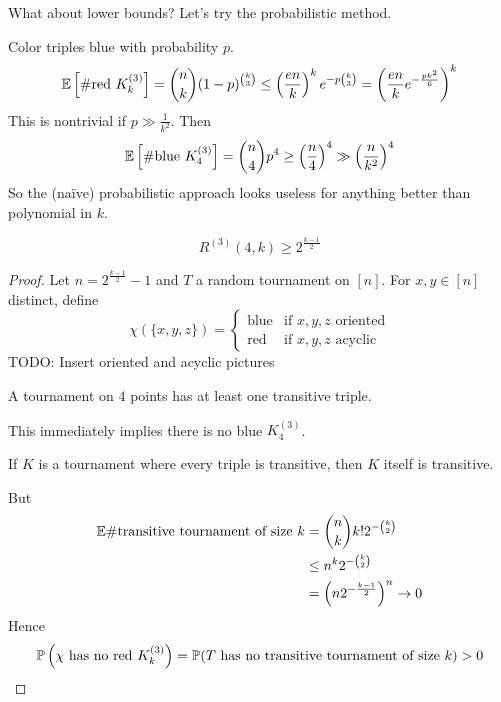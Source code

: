 \documentclass{article}
\begin{document}
\newlec

What about lower bounds? Let's try the probabilistic method.

Color triples blue with probability $p$.
$$\bbE\left[\#\text{red }K_k^{(3)}\right] = \binom nk (1 - p)^{\binom k3} \le \left(\frac{en}k\right)^k e^{-p\binom k3} = \left(\frac{en}k e^{-\frac{pk^2}6}\right)^k$$
This is nontrivial if $p \gg \frac 1{k^2}$. Then
$$\bbE\left[\#\text{blue }K_4^{(3)}\right] = \binom n4 p^4 \ge \left(\frac n4\right)^4 \gg \left(\frac n{k^2}\right)^4$$
So the (naïve) probabilistic approach looks useless for anything better than polynomial in $k$.

\begin{thm}
  $$R^{(3)}(4, k) \ge 2^{\frac{k - 1}2}$$
\end{thm}
\begin{proof}
  Let $n = 2^{\frac{k - 1}2} - 1$ and $T$ a random tournament on $[n]$. For $x, y \in [n]$ distinct, define
  $$\chi(\{x, y, z\}) =
  \begin{cases}
    \text{blue} & \text{if $x, y, z$ oriented} \\
    \text{red} & \text{if $x, y, z$ acyclic}
  \end{cases}$$
  TODO: Insert oriented and acyclic pictures
  \begin{obs}
    A tournament on $4$ points has at least one transitive triple.
  \end{obs}
  This immediately implies there is no blue $K_4^{(3)}$.
  \begin{obs}
    If $K$ is a tournament where every triple is transitive, then $K$ itself is transitive.
  \end{obs}
  But
  \begin{align*}
    \bbE \#\text{transitive tournament of size } k
    & = \binom nk k! 2^{-\binom k2} \\
    & \le n^k 2^{-\binom k2} \\
    & = \left(n2^{-\frac{k - 1}2}\right)^n \to 0
  \end{align*}
  Hence
  $$\P\left(\chi \text{ has no red } K_k^{(3)}\right) = \P(T \text{ has no transitive tournament of size } k) > 0$$
\end{proof}
\end{document}
